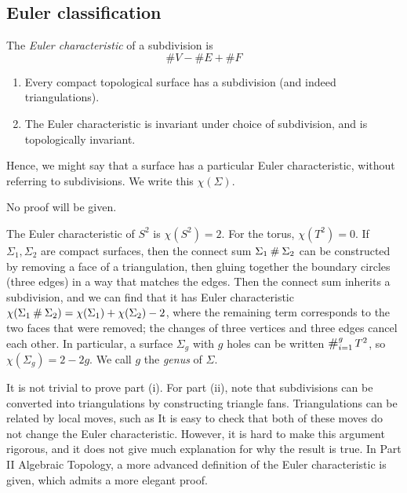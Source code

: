 \subsection{Euler classification}
\begin{definition}
	The \textit{Euler characteristic} of a subdivision is
	\[
		\# V - \# E + \# F
	\]
\end{definition}
\begin{theorem}
	\begin{enumerate}
		\item Every compact topological surface has a subdivision (and indeed triangulations).
		\item The Euler characteristic is invariant under choice of subdivision, and is topologically invariant.
	\end{enumerate}
	Hence, we might say that a surface has a particular Euler characteristic, without referring to subdivisions.
	We write this \( \chi(\Sigma) \).
\end{theorem}
No proof will be given.
\begin{example}
	The Euler characteristic of \( S^2 \) is \( \chi(S^2) = 2 \).
	For the torus, \( \chi(T^2) = 0 \).
	If \( \Sigma_1, \Sigma_2 \) are compact surfaces, then the connect sum \( \Sigma_1 \mathbin{\#} \Sigma_2 \) can be constructed by removing a face of a triangulation, then gluing together the boundary circles (three edges) in a way that matches the edges.
	Then the connect sum inherits a subdivision, and we can find that it has Euler characteristic \( \chi(\Sigma_1 \mathbin{\#} \Sigma_2) = \chi(\Sigma_1) + \chi(\Sigma_2) - 2 \), where the remaining term corresponds to the two faces that were removed; the changes of three vertices and three edges cancel each other.
	In particular, a surface \( \Sigma_g \) with \( g \) holes can be written \( \bigconnect_{i=1}^g T^2 \), so \( \chi(\Sigma_g) = 2 - 2g \).
	We call \( g \) the \textit{genus} of \( \Sigma \).
\end{example}
\begin{remark}
	It is not trivial to prove part (i).
	For part (ii), note that subdivisions can be converted into triangulations by constructing triangle fans.
	Triangulations can be related by local moves, such as
	It is easy to check that both of these moves do not change the Euler characteristic.
	However, it is hard to make this argument rigorous, and it does not give much explanation for why the result is true.
	In Part II Algebraic Topology, a more advanced definition of the Euler characteristic is given, which admits a more elegant proof.
\end{remark}
